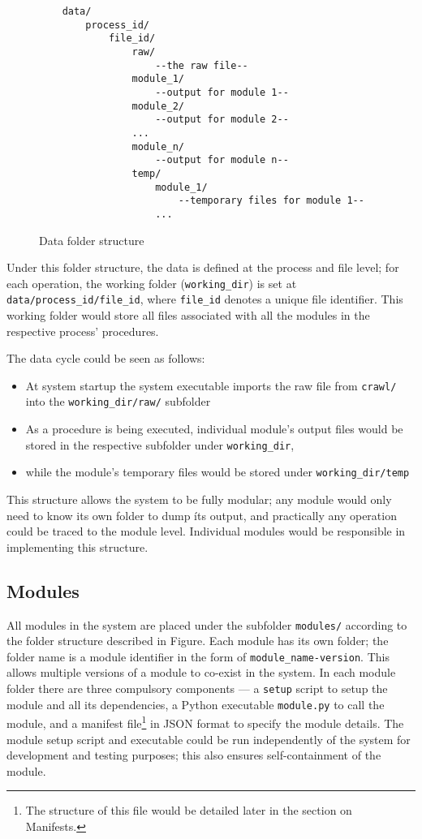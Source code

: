 \begin{figure}[ht]
\begin{lstlisting}
    data/
        process_id/
            file_id/
                raw/
                    --the raw file--
                module_1/
                    --output for module 1--
                module_2/
                    --output for module 2--
                ...
                module_n/
                    --output for module n--
                temp/
                    module_1/
                        --temporary files for module 1--
                    ...
\end{lstlisting}   
\caption{Data folder structure}\label{data} 
\end{figure}

Under this folder structure, the data is defined at the process and file level;
for each operation, the working folder (\texttt{working\_dir}) is set at
\texttt{data/process\_id/file\_id}, where \texttt{file\_id} denotes a unique
file identifier. This working folder would store all files associated with all
the modules in the respective process' procedures.

The data cycle could be seen as follows:

\begin{itemize}
    \item At system startup the system executable imports the raw file from
    \texttt{crawl/} into the \texttt{working\_dir/raw/} subfolder
    \item As a procedure is being executed, individual module's output files
    would be stored in the respective subfolder under \texttt{working\_dir},
    \item while the module's temporary files would be stored under
    \texttt{working\_dir/temp}
\end{itemize}

This structure allows the system to be fully modular; any module would only need
to know its own folder to dump íts output, and practically any operation could
be traced to the module level. Individual modules would be responsible in
implementing this structure.

\subsection{Modules}\label{sec:im:arch:mod}

All modules in the system are placed under the subfolder \texttt{modules/}
according to the folder structure described in Figure.
Each module has its own folder; the folder name is a module identifier in
the form of \texttt{module\_name-version}. This allows multiple versions of
a module to co-exist in the system. In each module folder there are three
compulsory components --- a \texttt{setup} script to setup the module and all
its dependencies, a Python executable \texttt{module.py} to call the module,
and a manifest file\footnote{The structure of this file would be detailed later
in the section on Manifests.} in JSON format to specify the module details.
The module setup script and executable could be run independently of the system
for development and testing purposes; this also ensures self-containment of the
module.

